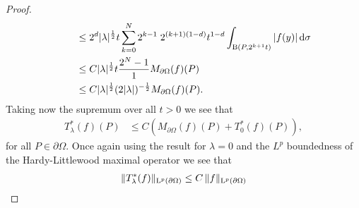 \begin{proof}
\begin{align*}
     &\qquad\leq 2^d  |\lambda|^{\frac{1}{2}} t \sum_{k = 0}^N 2^{k - 1}\; 2^{(k + 1)(1 - d)} t^{1 - d} \int_{\mathrm{B}(P, 2^{k + 1}t)} |f(y)| \, {\operatorname{d}\!{\sigma}} \\
     &\qquad \leq C  |\lambda|^{\frac{1}{2}} t\frac{2^{N} - 1}{1} M_{\partial\Omega}(f)(P) \\
     &\qquad \leq C |\lambda|^{\frac{1}{2}} (2|\lambda|)^{-\frac{1}{2}} M_{\partial\Omega}(f)(P).
   \end{align*}
   Taking now the supremum over all $t > 0$ we see that
   \begin{align*}
     T_\lambda^*(f)(P)
     &\leq C (M_{\partial\Omega}(f)(P) + T_0^*(f)(P)),
   \end{align*}
   for all $P \in \partial\Omega$. Once again using the result for $\lambda = 0$ and the $L^p$ boundedness of the Hardy-Littlewood maximal operator we see that
   \begin{align*}
     \|T_\lambda^*(f) \|_{\mathrm{L}^p(\partial\Omega)} \leq C\, \|f\|_{\mathrm{L}^p(\partial\Omega)}
   \end{align*}


\end{proof}
